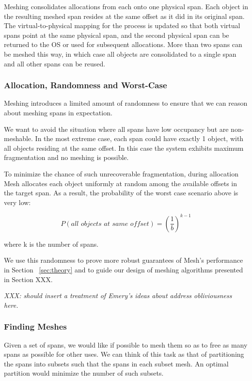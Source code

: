 Meshing consolidates allocations from each onto one physical span.
Each object in the resulting meshed span resides at the same offset as
it did in its original span.  The virtual-to-physical mapping for the
process is updated so that both virtual spans point at the same
physical span, and the second physical span can be returned to the OS
or used for subsequent allocations.  More than two spans can be meshed this way, in which case all objects are consolidated to a single span and all other spans can be reused.


\subsubsection{Allocation, Randomness and Worst-Case}

Meshing introduces a limited amount of randomness to ensure that we
can reason about meshing spans in expectation.

We want to avoid the situation where all spans have low occupancy but
are non-meshable.  In the most extreme case, each span could have exactly 1 object, with all objects residing at the same offset.  In this case the system exhibits maximum fragmentation and no meshing is possible.  

To minimize the chance of such unrecoverable fragmentation, during allocation Mesh allocates each object uniformly at random among the available offsets in the target span.  As a result, the probability of the worst case scenario above is very low:

$$P(\textit{all objects at same offset}) = (\frac{1}{b})^{k-1}$$

where k is the number of spans.

We use this randomness to prove more robust guarantees of Mesh's performance in Section ~\ref{sec:theory} and to guide our design of meshing algorithms presented in Section XXX.

\textit{XXX: should insert a treatment of Emery's ideas about address obliviousness here.}


\subsubsection{Finding Meshes}

Given a set of spans, we would like if possible to mesh them so as to free as many spans as possible for other uses.  We can think of this task as that of partitioning the spans into subsets such that the spans in each subset mesh.  An optimal partition would minimize the number of such subsets.

